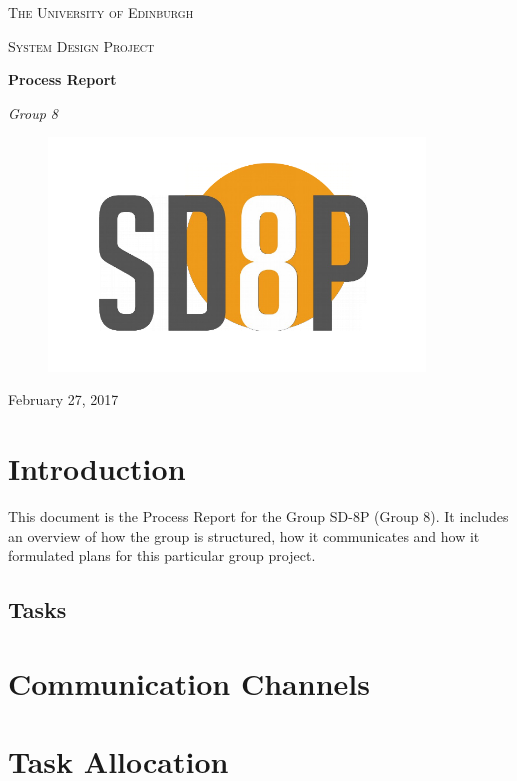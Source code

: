 \documentclass[a4paper,12pt]{article}
\begin{document}
\begin{titlepage}
	\centering
	{\scshape\LARGE The University of Edinburgh \par}
	\vspace{1cm}
	{\scshape\Large System Design Project\par}
	\vspace{1.5cm}
	{\huge\bfseries Process Report\par}
	\vspace{2cm}
	{\Large\itshape Group 8\par}
	\vfill
\begin{figure}[H]
    \centering
    \includegraphics[width=10cm]{sd8plogo}
    \label{fig:robot}
\end{figure}
	\vfill

	{\large February 27, 2017\par}
\end{titlepage}

\section{Introduction}
This document is the Process Report for the Group SD-8P (Group 8). It includes an overview of how the group is structured, how it communicates and how it formulated plans for this particular group project.
\subsection{Tasks}


\section{Communication Channels}


\section{Task Allocation}

\end{document}
